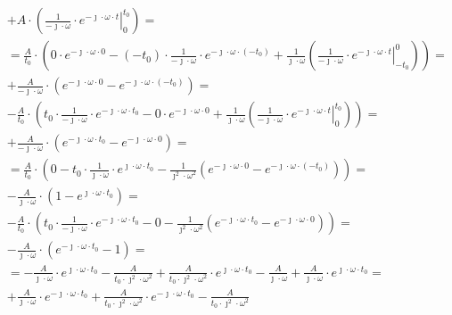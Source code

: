\begin{task}
\begin{align*}
&+ A\cdot \left( \left. \frac{1}{-\jmath \cdot \omega}\cdot e^{ -\jmath \cdot \omega \cdot t} \right|_{0}^{t_{0}}\right)=\\
&=\frac{A}{t_{0}}\cdot \left( 0 \cdot e^{-\jmath \cdot \omega \cdot 0} - (-t_{0}) \cdot \frac{1}{-\jmath \cdot \omega}\cdot e^{ -\jmath \cdot \omega \cdot (-t_{0})} %
+ \frac{1}{\jmath \cdot \omega} \left( \left. \frac{1}{-\jmath \cdot \omega}\cdot e^{ -\jmath \cdot \omega \cdot t} \right|_{-t_{0}}^{0}\right)\right)=\\
&+ \frac{A}{-\jmath \cdot \omega} \cdot \left( e^{ -\jmath \cdot \omega \cdot 0} - e^{ -\jmath \cdot \omega \cdot (-t_{0})} \right)=\\
&-\frac{A}{t_{0}}\cdot \left(t_{0} \cdot \frac{1}{-\jmath \cdot \omega}\cdot e^{ -\jmath \cdot \omega \cdot t_{0}} - 0 \cdot e^{-\jmath \cdot \omega \cdot 0} 
+ \frac{1}{\jmath \cdot \omega} \left( \left. \frac{1}{-\jmath \cdot \omega}\cdot e^{ -\jmath \cdot \omega \cdot t} \right|_{0}^{t_{0}}\right)\right)=\\
&+ \frac{A}{-\jmath \cdot \omega} \cdot \left( e^{ -\jmath \cdot \omega \cdot t_{0}} - e^{ -\jmath \cdot \omega \cdot 0} \right)=\\
&=\frac{A}{t_{0}}\cdot \left( 0 - t_{0} \cdot \frac{1}{\jmath \cdot \omega}\cdot e^{ \jmath \cdot \omega \cdot t_{0}} %
- \frac{1}{\jmath^{2} \cdot \omega^{2}} \left( e^{ -\jmath \cdot \omega \cdot 0} - e^{ -\jmath \cdot \omega \cdot (-t_{0})} \right)\right)=\\
&- \frac{A}{\jmath \cdot \omega} \cdot \left( 1 - e^{ \jmath \cdot \omega \cdot t_{0}} \right)=\\
&-\frac{A}{t_{0}}\cdot \left(t_{0} \cdot \frac{1}{-\jmath \cdot \omega}\cdot e^{ -\jmath \cdot \omega \cdot t_{0}} - 0 
- \frac{1}{\jmath^{2} \cdot \omega^{2}} \left(e^{ -\jmath \cdot \omega \cdot t_{0}}-e^{ -\jmath \cdot \omega \cdot 0}\right)\right)=\\
&- \frac{A}{\jmath \cdot \omega} \cdot \left( e^{ -\jmath \cdot \omega \cdot t_{0}} - 1\right)=\\
&=-\frac{A}{\jmath \cdot \omega} \cdot e^{ \jmath \cdot \omega \cdot t_{0}} - \frac{A}{t_{0} \cdot \jmath^{2} \cdot \omega^{2}} + \frac{A}{t_{0} \cdot \jmath^{2} \cdot \omega^{2}} \cdot e^{ \jmath \cdot \omega \cdot t_{0}} %
- \frac{A}{\jmath \cdot \omega} + \frac{A}{\jmath \cdot \omega} \cdot e^{ \jmath \cdot \omega \cdot t_{0}}=\\
&+\frac{A}{\jmath \cdot \omega} \cdot e^{ -\jmath \cdot \omega \cdot t_{0}}  + \frac{A}{t_{0} \cdot \jmath^{2} \cdot \omega^{2}} \cdot e^{- \jmath \cdot \omega \cdot t_{0}} - \frac{A}{t_{0} \cdot \jmath^{2} \cdot \omega^{2}}

\end{align*}
\end{task}
